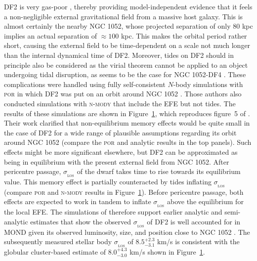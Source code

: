 \documentclass[fleqn,usenatbib,useAMS,onecolumn]{mnras} %
\begin{document}
\begin{figure}
	\label{Haghi_2019_DF2_Figure_5}
\end{figure}

DF2 is very gas-poor \citep{Chowdhury_2019, Sardone_2019}, thereby providing model-independent evidence that it feels a non-negligible external gravitational field from a massive host galaxy. This is almost certainly the nearby NGC 1052, whose projected separation of only 80 kpc implies an actual separation of $\approx 100$ kpc. This makes the orbital period rather short, causing the external field to be time-dependent on a scale not much longer than the internal dynamical time of DF2. Moreover, tides on DF2 should in principle also be considered as the virial theorem cannot be applied to an object undergoing tidal disruption, as seems to be the case for NGC 1052-DF4 \citep{Montes_2020, Keim_2022}. These complications were handled using fully self-consistent $N$-body simulations with \textsc{por} \citep{Lughausen_2015} in which DF2 was put on an orbit around NGC 1052 \citep{Haghi_2019_DF2}. Those authors also conducted simulations with \textsc{n-mody} \citep{Ciotti_2006} that include the EFE but not tides. The results of these simulations are shown in Figure~\ref{Haghi_2019_DF2_Figure_5}, which reproduces figure~5 of \citet{Haghi_2019_DF2}. Their work clarified that non-equilibrium memory effects would be quite small in the case of DF2 for a wide range of plausible assumptions regarding its orbit around NGC 1052 (compare the \textsc{por} and analytic results in the top panels). Such effects might be more significant elsewhere, but DF2 can be approximated as being in equilibrium with the present external field from NGC 1052. After pericentre passage, $\sigma_{_\text{LOS}}$ of the dwarf takes time to rise towards its equilibrium value. This memory effect \citep{Haghi_2009, Wu_2013} is partially counteracted by tides inflating $\sigma_{_\text{LOS}}$ (compare \textsc{por} and \textsc{n-mody} results in Figure~\ref{Haghi_2019_DF2_Figure_5}). Before pericentre passage, both effects are expected to work in tandem to inflate $\sigma_{_\text{LOS}}$ above the equilibrium for the local EFE. The simulations of \citet{Haghi_2019_DF2} therefore support earlier analytic and semi-analytic estimates that show the observed $\sigma_{_\text{LOS}}$ of DF2 is well accounted for in MOND given its observed luminosity, size, and position close to NGC 1052 \citep{Famaey_2018, Kroupa_2018_DF2}. The subsequently measured stellar body $\sigma_{_\text{LOS}}$ of $8.5^{+2.3}_{-3.1}$ km/s \citep{Danieli_2019} is consistent with the globular cluster-based estimate of $8.0^{+4.3}_{-3.0}$ km/s shown in Figure~\ref{Haghi_2019_DF2_Figure_5}.
\end{document}
